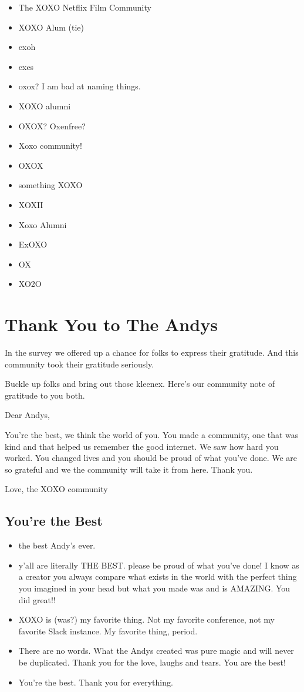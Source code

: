\documentclass[
]{book}
\providecommand{\tightlist}{%
  \setlength{\itemsep}{0pt}\setlength{\parskip}{0pt}}
\begin{document}
\begin{itemize}
\tightlist
\item
  The XOXO Netflix Film Community
\item
  XOXO Alum (tie)
\item
  exoh
\item
  exes
\item
  oxox? I am bad at naming things.
\item
  XOXO alumni
\item
  OXOX? Oxenfree?
\item
  Xoxo community!
\item
  OXOX
\item
  something XOXO
\item
  XOXII
\item
  Xoxo Alumni
\item
  ExOXO
\item
  OX
\item
  XO2O
\end{itemize}

\chapter{Thank You to The Andys}\label{thank-you-to-the-andys}

In the survey we offered up a chance for folks to express their gratitude. And this community took their gratitude seriously.

Buckle up folks and bring out those kleenex. Here's our community note of gratitude to you both.

Dear Andys,

You're the best, we think the world of you. You made a community, one that was kind and that helped us remember the good internet. We saw how hard you worked. You changed lives and you should be proud of what you've done. We are so grateful and we the community will take it from here. Thank you.

Love, the XOXO community

\section{You're the Best}\label{youre-the-best}

\begin{itemize}
\tightlist
\item
  the best Andy's ever.
\item
  y'all are literally THE BEST. please be proud of what you've done! I know as a creator you always compare what exists in the world with the perfect thing you imagined in your head but what you made was and is AMAZING. You did great!!
\item
  XOXO is (was?) my favorite thing. Not my favorite conference, not my favorite Slack instance. My favorite thing, period.
\item
  There are no words. What the Andys created was pure magic and will never be duplicated. Thank you for the love, laughs and tears. You are the best!
\item
  You're the best. Thank you for everything.
\end{itemize}
\end{document}
